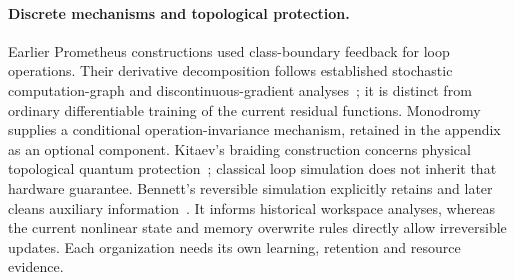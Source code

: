 \paragraph{Discrete mechanisms and topological protection.}
Earlier Prometheus constructions used class-boundary feedback for loop
operations. Their derivative decomposition follows established stochastic
computation-graph and discontinuous-gradient
analyses~\cite{schulman2015stochastic,lee2018reparameterization}; it is distinct
from ordinary differentiable training of the current residual functions.
Monodromy supplies a conditional operation-invariance mechanism, retained in
the appendix as an optional component. Kitaev's braiding construction concerns
physical topological quantum protection~\cite{kitaev2003fault}; classical loop
simulation does not inherit that hardware guarantee. Bennett's reversible
simulation explicitly retains and later cleans auxiliary
information~\cite{bennett1973logical}. It informs historical workspace analyses,
whereas the current nonlinear state and memory overwrite rules directly
allow irreversible updates. Each organization needs its own learning,
retention and resource evidence.
